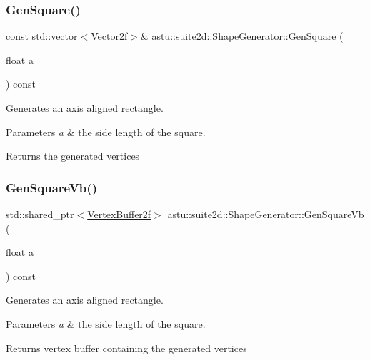 \subsubsection{\texorpdfstring{Gen\+Square()}{GenSquare()}}
{\footnotesize\ttfamily const std\+::vector$<$\hyperlink{classastu_1_1Vector2}{Vector2f}$>$\& astu\+::suite2d\+::\+Shape\+Generator\+::\+Gen\+Square (\begin{DoxyParamCaption}\item[{float}]{a }\end{DoxyParamCaption}) const\hspace{0.3cm}{\ttfamily [inline]}}

Generates an axis aligned rectangle.


\begin{DoxyParams}{Parameters}
{\em a} & the side length of the square. \\
\hline
\end{DoxyParams}
\begin{DoxyReturn}{Returns}
the generated vertices 
\end{DoxyReturn}
\mbox{\label{classastu_1_1suite2d_1_1ShapeGenerator_a8f60eae937399f59d2ff2be56f91a6cd}} 
\subsubsection{\texorpdfstring{Gen\+Square\+Vb()}{GenSquareVb()}}
{\footnotesize\ttfamily std\+::shared\+\_\+ptr$<$\hyperlink{group__gfx__group_ga081cf45a441eef100dfbb1e0f64c3826}{Vertex\+Buffer2f}$>$ astu\+::suite2d\+::\+Shape\+Generator\+::\+Gen\+Square\+Vb (\begin{DoxyParamCaption}\item[{float}]{a }\end{DoxyParamCaption}) const\hspace{0.3cm}{\ttfamily [inline]}}

Generates an axis aligned rectangle.


\begin{DoxyParams}{Parameters}
{\em a} & the side length of the square. \\
\hline
\end{DoxyParams}
\begin{DoxyReturn}{Returns}
vertex buffer containing the generated vertices 
\end{DoxyReturn}
\mbox{\label{classastu_1_1suite2d_1_1ShapeGenerator_a58c9369dfe59e735b8eba6b5ef994598}} 
